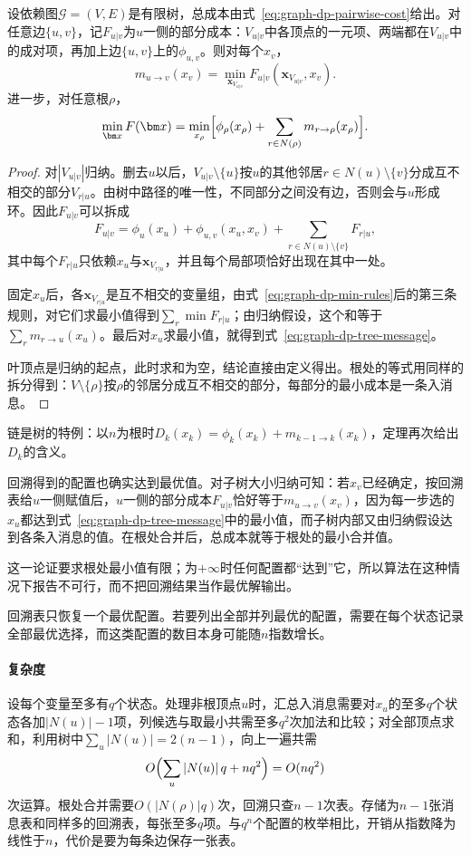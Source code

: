 \begin{theorem}[树上消息的含义]
\label{thm:graph-dp-tree-message}
设依赖图$\mathcal G=(V,E)$是有限树，总成本由式~\eqref{eq:graph-dp-pairwise-cost}给出。对任意边$\{u,v\}$，记$F_{u|v}$为$u$一侧的部分成本：$V_{u|v}$中各顶点的一元项、两端都在$V_{u|v}$中的成对项，再加上边$\{u,v\}$上的$\phi_{u,v}$。则对每个$x_v$，
\[
m_{u\to v}(x_v)=\min_{\bm x_{V_{u|v}}}F_{u|v}(\bm x_{V_{u|v}},x_v).
\]
进一步，对任意根$\rho$，
\[
\min_{\bm x}F(\bm x)=\min_{x_\rho}\Bigl[\phi_\rho(x_\rho)+\sum_{r\in N(\rho)}m_{r\to\rho}(x_\rho)\Bigr].
\]
\end{theorem}

\begin{proof}
对$|V_{u|v}|$归纳。删去$u$以后，$V_{u|v}\setminus\{u\}$按$u$的其他邻居$r\in N(u)\setminus\{v\}$分成互不相交的部分$V_{r|u}$。由树中路径的唯一性，不同部分之间没有边，否则会与$u$形成环。因此$F_{u|v}$可以拆成
\[
F_{u|v}=\phi_u(x_u)+\phi_{u,v}(x_u,x_v)+\sum_{r\in N(u)\setminus\{v\}}F_{r|u},
\]
其中每个$F_{r|u}$只依赖$x_u$与$\bm x_{V_{r|u}}$，并且每个局部项恰好出现在其中一处。

固定$x_u$后，各$\bm x_{V_{r|u}}$是互不相交的变量组，由式~\eqref{eq:graph-dp-min-rules}后的第三条规则，对它们求最小值得到$\sum_r\min F_{r|u}$；由归纳假设，这个和等于$\sum_r m_{r\to u}(x_u)$。最后对$x_u$求最小值，就得到式~\eqref{eq:graph-dp-tree-message}。

叶顶点是归纳的起点，此时求和为空，结论直接由定义得出。根处的等式用同样的拆分得到：$V\setminus\{\rho\}$按$\rho$的邻居分成互不相交的部分，每部分的最小成本是一条入消息。
\end{proof}

链是树的特例：以$n$为根时$D_k(x_k)=\phi_k(x_k)+m_{k-1\to k}(x_k)$，定理再次给出$D_k$的含义。

回溯得到的配置也确实达到最优值。对子树大小归纳可知：若$x_v$已经确定，按回溯表给$u$一侧赋值后，$u$一侧的部分成本$F_{u|v}$恰好等于$m_{u\to v}(x_v)$，因为每一步选的$x_u$都达到式~\eqref{eq:graph-dp-tree-message}中的最小值，而子树内部又由归纳假设达到各条入消息的值。在根处合并后，总成本就等于根处的最小合并值。

这一论证要求根处最小值有限；为$+\infty$时任何配置都“达到”它，所以算法在这种情况下报告不可行，而不把回溯结果当作最优解输出。

回溯表只恢复一个最优配置。若要列出全部并列最优的配置，需要在每个状态记录全部最优选择，而这类配置的数目本身可能随$n$指数增长。

\paragraph{复杂度}
设每个变量至多有$q$个状态。处理非根顶点$u$时，汇总入消息需要对$x_u$的至多$q$个状态各加$|N(u)|-1$项，列候选与取最小共需至多$q^2$次加法和比较；对全部顶点求和，利用树中$\sum_u|N(u)|=2(n-1)$，向上一遍共需
\[
O\Bigl(\sum_u|N(u)|\,q+nq^2\Bigr)=O(nq^2)
\]
次运算。根处合并需要$O(|N(\rho)|q)$次，回溯只查$n-1$次表。存储为$n-1$张消息表和同样多的回溯表，每张至多$q$项。与$q^n$个配置的枚举相比，开销从指数降为线性于$n$，代价是要为每条边保存一张表。

